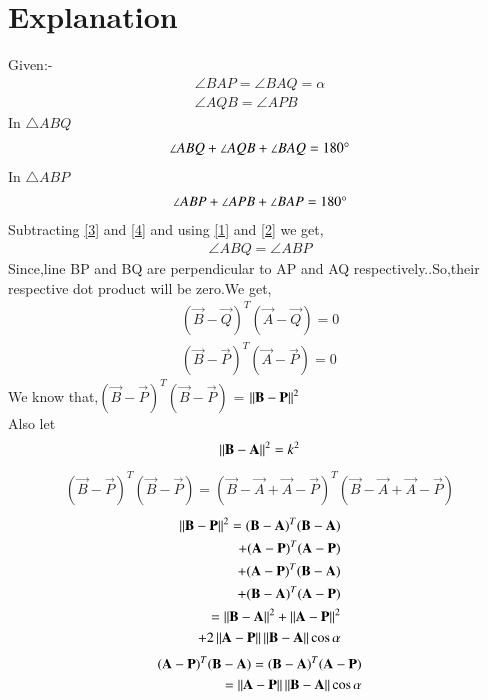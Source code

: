 \documentclass[journal,12pt,twocolumn]{IEEEtran}
\begin{document}
\section{Explanation}
Given:-
\begin{align}
  \angle{BAP}=\angle{BAQ}=\alpha\label{1}\\ 
    \angle{AQB}=\angle{APB}\label{2}
\end{align}
In $\triangle ABQ$
\begin{align}
    \angle{ABQ} + \angle{AQB} + \angle{BAQ}=180\degree\label{3}
\end{align}
In $\triangle ABP$
\begin{align}
    \angle{ABP} + \angle{APB} + \angle{BAP}=180\degree\label{4}
\end{align}
Subtracting \eqref{3} and \eqref{4} and using \eqref{1} and \eqref{2} we get,
\begin{align}
\angle{ABQ}=\angle{ABP}
\end{align}
Since,line BP and BQ are perpendicular to AP and AQ respectively..So,their respective dot product will be zero.We get,
\begin{align}
    (\vec{B}-\vec{Q})^T(\vec{A}-\vec{Q})=0\label{5}\\
    (\vec{B}-\vec{P})^T(\vec{A}-\vec{P})=0\label{6}
\end{align}
We know that,$(\vec{B}-\vec{P})^T(\vec{B}-\vec{P})$ = $\left\lVert\mathbf{B}-\mathbf{P}\right\rVert^2$\\
 Also let
 \begin{align}
 \left\lVert\mathbf{B}-\mathbf{A}\right\rVert^2 = k^2\label{7}
 \end{align}
\begin{align}
(\vec{B}-\vec{P})^T(\vec{B}-\vec{P})=(\vec{B}-\vec{A}+\vec{A}-\vec{P})^T(\vec{B}-\vec{A}+\vec{A}-\vec{P})
\end{align}
\begin{align}
 \begin{split}
\left\lVert\mathbf{B}-\mathbf{P}\right\rVert^2=(\mathbf{B}-\mathbf{A})^T(\mathbf{B}-\mathbf{A})\\
+(\mathbf{A}-\mathbf{P})^T(\mathbf{A}-\mathbf{P})\\
+(\mathbf{A}-\mathbf{P})^T(\mathbf{B}-\mathbf{A})\\
+(\mathbf{B}-\mathbf{A})^T(\mathbf{A}-\mathbf{P})\\
=\left\lVert\mathbf{B}-\mathbf{A}\right\rVert^2 + \left\lVert\mathbf{A}-\mathbf{P}\right\rVert^2\\ 
  + 2\left\lVert\mathbf{A}-\mathbf{P}\right\rVert\left\lVert\mathbf{B}-\mathbf{A}\right\rVert\cos\alpha\label{8}
  \end{split}
\end{align}
\begin{align}
\begin{split}
 (\mathbf{A}-\mathbf{P})^T(\mathbf{B}-\mathbf{A})=(\mathbf{B}-\mathbf{A})^T(\mathbf{A}-\mathbf{P})\\
 = \left\lVert\mathbf{A}-\mathbf{P}\right\rVert \left\lVert\mathbf{B}-\mathbf{A}\right\rVert \cos\alpha\label{18}
\end{split}
\end{align}
\end{document}
